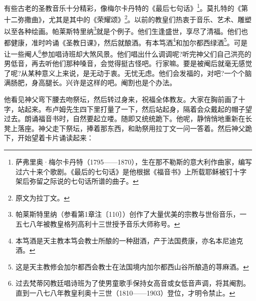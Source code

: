 \par 有些古老的圣教音乐十分精彩，像梅尔卡丹特的《最后七句话》\footnote{萨弗里奥·梅尔卡丹特（1795——1870），生在那不勒斯的意大利作曲家，编写过六十来个歌剧。《最后的七句话》是他根据《福音书》上所载耶稣被钉十字架后弥留之际说的七句话所谱的曲子。}。莫扎特的《第十二弥撒曲》，尤其是其中的《荣耀颂》\footnote{原文为拉丁文。}。以前的教皇们热衷于音乐、艺术、雕塑以至各种绘画。帕莱斯特里纳\footnote{帕莱斯特里纳（参看第1章注〔110〕）创作了大量优美的宗教与世俗音乐，一五七八年被教皇格列高利十三世授予音乐大师称号。}就是个例子。他们生逢盛世，享尽了清福。他们也都健康，准时吟诵《圣教日课》，然后就酿酒。有本笃酒\footnote{本笃酒是天主教本笃会教士所酿的一种甜酒，产于法国费康，亦名本尼迪克酒。}和加尔都西绿酒\footnote{这是天主教修会加尔都西会教士在法国境内加尔都西山谷所酿造的荨麻酒。}。可是让一些阉人\footnote{过去梵蒂冈教廷唱诗班为了使男童歌手保持女高音或女低音声调，将其阉割。直到一八七八年教皇利奥十三世（1810——1903）登位，才明令禁止。}参加唱诗班却大煞风景。他们唱出什么调调呢?听完神父们自己洪亮的男低音，再去听他们那种嗓音，会觉得挺古怪吧。行家嘛。要是被阉后就毫无感觉了呢?从某种意义上来说，是无动于衷。无忧无虑。他们会发福的，对吧?一个个脑满肠肥，身高腿长。兴许是这样的吧。阉割也是个办法。
\par 他看见神父弯下腰去吻祭坛，然后转过身来，祝福全体教友。大家在胸前画了十字，站起来。布卢姆先生四下里打量了一下，然后站起身，隔着会众戴起的帽子望过去。朗诵福音书时，自然要起立喽。随即又统统跪下。他呢，静悄悄地重新在长凳上落座。神父走下祭坛，捧着那东西，和助祭用拉丁文一问一答着。然后神父跪下，开始望着卡片诵读起来：
